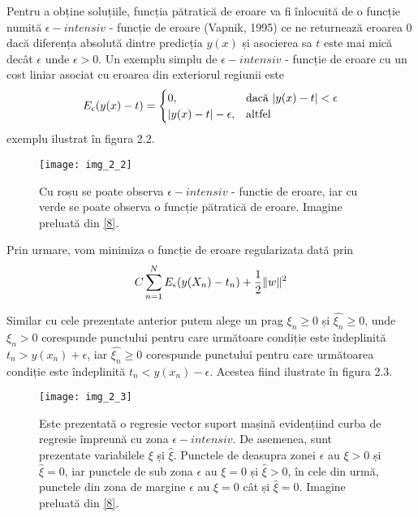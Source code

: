Pentru a obține soluțiile, funcția pătratică de eroare va fi înlocuită de o funcție numită $\epsilon - intensiv$ - funcție de eroare (Vapnik, 1995) ce ne returnează eroarea 0 dacă diferența absolută dintre predicția $y(x)$ și asocierea sa $t$ este mai mică decât $\epsilon$ unde $\epsilon > 0$. Un exemplu simplu de $\epsilon - intensiv$ - funcție de eroare cu un cost liniar asociat cu eroarea din exteriorul regiunii este
\begin{align}
	E_{\epsilon}(y(x) - t) = 
	\begin{cases}
	0,& \text{dacă } \lvert y(x) - t\rvert < \epsilon\\
	\lvert y(x) - t\rvert - \epsilon,              & \text{altfel}
	\end{cases}
\end{align}
exemplu ilustrat în figura 2.2.
\begin{figure}[!h]
	\centering
	\texttt{[image: img\_2\_2]}
	\caption[Mașini cu vector suport pentru regresie]{Cu roșu se poate observa $\epsilon - intensiv$ - functie de eroare, iar cu verde se poate observa o funcție pătratică de eroare. Imagine preluată din \hyperlink{ChristopherBishop}{[8]}.}
\end{figure}
 
Prin urmare, vom minimiza o funcție de eroare regularizata dată prin
\begin{align}	
	C\sum_{n = 1}^{N}E_{\epsilon}(y(X_n) - t_n) + \frac{1}{2}\lVert w\rVert ^ 2
\end{align}

Similar cu cele prezentate anterior putem alege un prag $\xi_n \geq 0$ și $ \widehat{\xi_n} \geq 0$, unde $\xi_n > 0$ corespunde punctului pentru care următoare condiție este îndeplinită $t_n > y(x_n) + \epsilon$, iar  $ \widehat{\xi_n} \geq 0$ corespunde punctului pentru care următoarea condiție este îndeplinită $t_n < y(x_n) - \epsilon$. Acestea fiind ilustrate în figura 2.3.
\begin{figure}[!h]
	\centering
	\texttt{[image: img\_2\_3]}
	\caption[Mașini cu vector suport pentru regresie 2]{Este prezentată o regresie vector suport mașină evidențiind curba de regresie împreună cu zona $\epsilon - intensiv$. De asemenea, sunt prezentate variabilele $\xi$ și $ \widehat{\xi}$. Punctele de deasupra zonei $\epsilon$ au $\xi > 0$ și $ \widehat{\xi} = 0$, iar punctele de sub zona $\epsilon$ au $\xi = 0$ și $ \widehat{\xi} > 0$, în cele din urmă, punctele din zona de margine $\epsilon$ au $\xi = 0$ cât și $ \widehat{\xi} = 0$. Imagine preluată din \hyperlink{ChristopherBishop}{[8]}.}
\end{figure}

